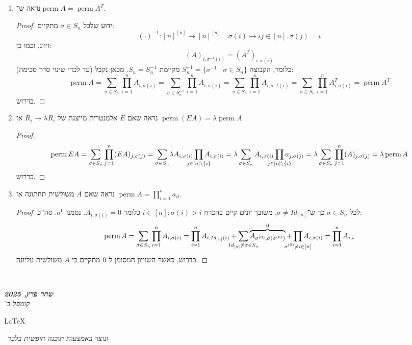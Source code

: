 \documentclass[]{article}
\newcommand\en[1] {\begin{otherlanguage}{english}#1\end{otherlanguage}}
\newcommand\ndoc  {\dotfill \\ \vfil {\begin{center}
            {\textbf{\textit{שחר פרץ, 2025}} \\
                \scriptsize \textit{קומפל ב־}\en{\LaTeX}\,\textit{ ונוצר באמצעות תוכנה חופשית בלבד}}
    \end{center}} \vfil	}
\newcommand\co        {\colon}
\renewcommand\lg      {\lambda}
\newcommand\sg        {\sigma}
\newcommand\op    {^{-1}}
\theoremstyle{definition}
\DeclareMathOperator{\perm}{perm}
\begin{document}
    \begin{enumerate}
        \item נראה ש־$\perm A = \perm A^T$. \begin{proof}
            ידוע שלכל $\sg \in S_n$ מתקיים: 
            \[ (\cdot)\op \co [n]^{[n]}\to [n]^{[n]} \quad \sg(i) \mapsto \iota j \in [n].\, \sg(j) = i \]
            זיווג, וכמו כן: 
            \[ (A)_{i, \sg\op(i)} = (A^T)_{i, \sg(i)} \]
            כלומר, הקבוצה $S\op_n = \{\sg\op \mid \sg \in S_n\}$ מקיימת $S_n = S\op_n$. מכאן נקבל (עד לכדי שינוי סדר סכימה): 
            \[ \perm A = \sum_{\sg \in S_n}\prod_{i = 1}^{n}A_{i, \sg(i)} = \sum_{\sg \in S\op_n}\prod_{i = 1}^{n}A_{i, \sg(i)} = \sum_{\sg \in S_n}\prod_{i = 1}^{n}A_{i, \sg\op(i)} = \sum_{\sg \in S_n}\prod_{i = 1}^{n}A^T_{i, \sg(i)} = \perm A^T \]
            כדרוש. 
        \end{proof}
        \item נראה שאם $E$ אלמנטרית מייצגת של $R_i \to \lg R_i$ אז $\perm(EA) = \lg \perm A$ \begin{proof}
            
            \[ \perm EA = \sum_{\sg \in S_n} \prod_{j = 1}^{n}(EA)_{j, \sg(j)} = \sum_{\sg \in S_n}\!\lg A_{i, \sg(i)}\prod_{\mathclap{j \in [n] \setminus \{i\}}}A_{i, \sg(i)} = \lg \sum_{\sg \in S_n}A_{i, \sg(i)}\prod_{\mathclap{j \in [n] \setminus \{i\}}} a_{j, \sg (j)} = \lg \sum_{\sg \in S_n}\prod_{j = 1}^{n}(A)_{j, \sg(j)} = \lg\perm A \]
            כדרוש. 
        \end{proof}
        \item נראה שאם $A$ משולשית תחתונה אז $\perm A = \prod_{i = 1}^{n}a_{ii}$. \begin{proof}
            לכל $\sg \in S_n$ כך ש־$\sg \neq Id_{[n]}$, משובך יונים קיים בהכרח $i \in [n] \co \sg(i) > i$ כלומר $A_{i, \sg(i)} = 0$. נסמנו $\sg^{0}$. סה''כ: 
            \[ \perm A = \sum_{\sg \in S_n} \prod_{i = 1}^{n}A_{i, \sg(i)} = \prod_{i =1}^{n} A_{i, Id_{[n]}(i)} + \sum_{\mathclap{Id_{[n]} \neq \sg \in S_n}}\overbrace{A_{\sg^{(0)}, \sg(\sg^{(0)})}}^{0} + \prod_{\mathclap{\sg^{(0)} \neq i \in [n]}}A_{i, \sg(i)} = \prod_{i = 1}^{n}A_{i, i} \]
            כדרוש, כאשר השוויון המסומן ל־$0$ מתקיים כי $A$ משולשית עליונה. 
        \end{proof}
    \end{enumerate}
    
    
    
    \ndoc
\end{document}
